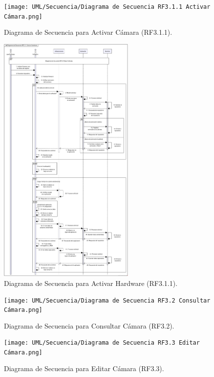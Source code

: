 \begin{figure}[H]
	\centering
		\caption{Diagrama de Secuencia para Activar Cámara (RF3.1.1).}
	\texttt{[image: UML/Secuencia/Diagrama de Secuencia RF3.1.1 Activar Cámara.png]}
\end{figure}


\begin{figure}[H]
	\centering
	\caption{Diagrama de Secuencia para Activar Hardware (RF3.1.1).}
	\includegraphics[width=0.6\textwidth]{UML/Secuencia/Diagrama de Secuencia RF3.1.1 Activar Hardware.png}
\end{figure}


\begin{figure}[H]
	\centering
		\caption{Diagrama de Secuencia para Consultar Cámara (RF3.2).}
	\texttt{[image: UML/Secuencia/Diagrama de Secuencia RF3.2 Consultar Cámara.png]}
\end{figure}


\begin{figure}[H]
	\centering
	\caption{Diagrama de Secuencia para Editar Cámara (RF3.3).}
 \texttt{[image: UML/Secuencia/Diagrama de Secuencia RF3.3 Editar Cámara.png]}
\end{figure}


